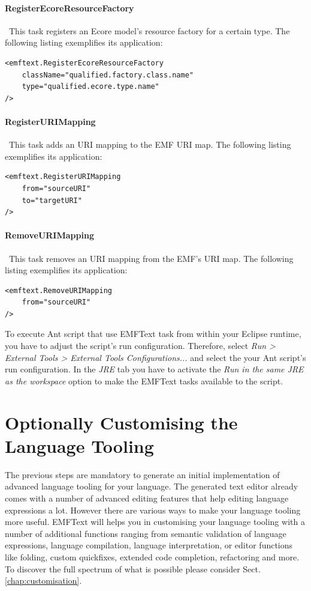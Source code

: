 	\paragraph*{RegisterEcoreResourceFactory}~This task registers an Ecore
	model's resource factory for a certain type. 
	The following listing exemplifies its application:
\begin{lstlisting}
<emftext.RegisterEcoreResourceFactory
	className="qualified.factory.class.name"
	type="qualified.ecore.type.name"
/>
\end{lstlisting}
	\paragraph*{RegisterURIMapping}~This task adds an URI mapping to the EMF URI
	map. 
	The following listing exemplifies its application:
\begin{lstlisting}
<emftext.RegisterURIMapping
	from="sourceURI"
	to="targetURI"
/>
\end{lstlisting}

\paragraph*{RemoveURIMapping}~This task removes an URI mapping from the EMF's
URI map. 
The following listing exemplifies its application: 
\begin{lstlisting}
<emftext.RemoveURIMapping
	from="sourceURI"
/>
\end{lstlisting}
	
	
	To execute Ant script that use EMFText task from within your Eclipse runtime,
	you have to adjust the script's run configuration. Therefore, select 
	\emph{Run > External Tools > External Tools Configurations...} and select the
	your Ant script's run configuration. In the \emph{JRE} tab you have to
	activate the \emph{Run in the same JRE as the workspace} option to make the
	EMFText tasks available to the script.
	
\section{Optionally Customising the Language Tooling}

The previous steps are mandatory to generate an initial implementation of
advanced language tooling for your language. The generated text editor already
comes with a number of advanced editing features that help editing language
expressions a lot. However there are various ways to make your language tooling
more useful. EMFText will helps you in customising your language tooling with a
number of additional functions ranging from semantic validation of language
expressions, language compilation, language interpretation, or editor functions
like folding, custom quickfixes, extended code completion, refactoring and more.
To discover the full spectrum of what is possible please consider Sect.
\ref{chap:customisation}.

